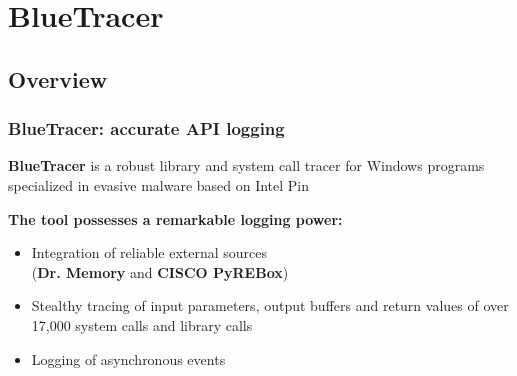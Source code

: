 \documentclass[compress]{beamer}
\begin{document}
\section{BlueTracer}

\subsection{Overview}
\begin{frame}
    \frametitle{BlueTracer: accurate API logging}

\medskip

\begin{beamerboxesrounded}[shadow=true]{}
\textbf{BlueTracer} is a robust library and system call tracer for Windows programs specialized in evasive malware based on Intel Pin
\end{beamerboxesrounded}

\bigskip

\textcolor{sapienza}{\textbf{The tool possesses a remarkable logging power:}}
\begin{itemize}
\item Integration of reliable external sources \\ (\textbf{Dr. Memory}
and \textbf{CISCO PyREBox})

\item Stealthy tracing of input parameters, output buffers and return values of over 17,000 system calls and library calls
\item Logging of asynchronous events
\end{itemize}    

\end{frame}
\end{document}

